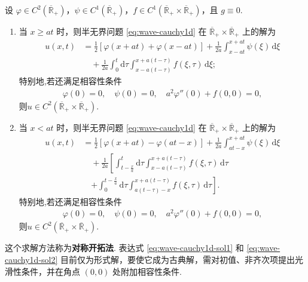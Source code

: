 \documentclass[../../main.tex]{subfiles}%
\begin{document}
\begin{theorem}[一维半无界波动方程齐次边值情形的解]\label{theroem:一维半无界波动方程齐次边值情形的解}
设 $\varphi\in C^2(\overline{\mathbb{R}}_+)$，$\psi\in C^1(\overline{\mathbb{R}}_+)$，$f\in C^1(\overline{\mathbb{R}}_+\times\overline{\mathbb{R}}_+)$，且 $g\equiv 0$. 
\begin{enumerate}[(1)]
\item 当 $x\geqslant at$ 时，则半无界问题 \eqref{eq:wave-cauchy1d} 在 $\overline{\mathbb{R}}_+\times\overline{\mathbb{R}}_+$ 上的解为
\begin{align}
u(x,t)&=\frac{1}{2}[\varphi(x+at)+\varphi(x-at)]+\frac{1}{2a}\int_{x-at}^{x+at}\psi(\xi)\,\mathrm{d}\xi \nonumber \\
&\quad+\frac{1}{2a}\int_0^t\mathrm{d}\tau\int_{x-a(t-\tau)}^{x+a(t-\tau)}f(\xi,\tau)\,\mathrm{d}\xi; \label{eq:wave-cauchy1d-sol1}
\end{align}
特别地,若还满足相容性条件
\begin{align*}
\varphi(0)=0, \quad
\psi(0)=0, \quad
a^2\varphi''(0)+f(0,0)=0,
\end{align*}
则$u\in C^2(\overline{\mathbb{R}}_+\times\overline{\mathbb{R}}_+)$.

\item 当 $x<at$ 时，则半无界问题 \eqref{eq:wave-cauchy1d} 在 $\overline{\mathbb{R}}_+\times\overline{\mathbb{R}}_+$ 上的解为
\begin{align}
u(x,t)&=\frac{1}{2}[\varphi(x+at)-\varphi(at-x)]+\frac{1}{2a}\int_{at-x}^{x+at}\psi(\xi)\,\mathrm{d}\xi \nonumber \\
&\quad+\frac{1}{2a}\left[\int_{t-\frac{x}{a}}^t\mathrm{d}\tau\int_{x-a(t-\tau)}^{x+a(t-\tau)}f(\xi,\tau)\,\mathrm{d}\tau\right. \nonumber \\
&\quad\left.+\int_0^{t-\frac{x}{a}}\mathrm{d}\tau\int_{a(t-\tau)-x}^{x+a(t-\tau)}f(\xi,\tau)\,\mathrm{d}\tau\right]. \label{eq:wave-cauchy1d-sol2}
\end{align}
特别地,若还满足相容性条件
\begin{align*}
\varphi(0)=0, \quad
\psi(0)=0, \quad
a^2\varphi''(0)+f(0,0)=0,
\end{align*}
则$u\in C^2(\overline{\mathbb{R}}_+\times\overline{\mathbb{R}}_+)$.
\end{enumerate}
\end{theorem}
\begin{remark}
这个求解方法称为\textbf{对称开拓法}. 表达式 \eqref{eq:wave-cauchy1d-sol1} 和 \eqref{eq:wave-cauchy1d-sol2} 目前仅为形式解，要使它成为古典解，需对初值、非齐次项提出光滑性条件，并在角点 $(0,0)$ 处附加相容性条件.
\end{remark}
\end{document}
